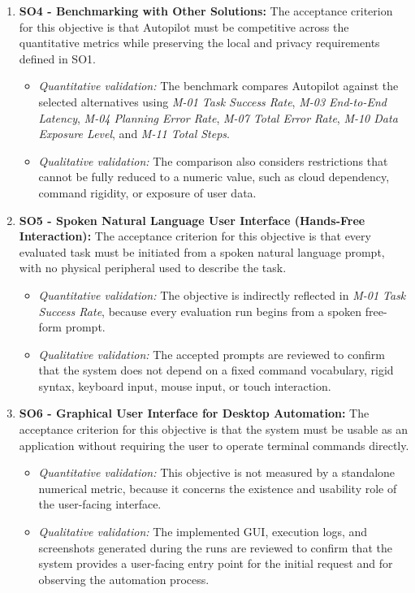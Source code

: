 \begin{enumerate}
    \item \textbf{SO4 - Benchmarking with Other Solutions:}
    The acceptance criterion for this objective is that Autopilot must be competitive across the quantitative metrics while preserving the local and privacy requirements defined in SO1.

    \begin{itemize}
        \item \textit{Quantitative validation:} The benchmark compares Autopilot against the selected alternatives using \textit{M-01 Task Success Rate}, \textit{M-03 End-to-End Latency}, \textit{M-04 Planning Error Rate}, \textit{M-07 Total Error Rate}, \textit{M-10 Data Exposure Level}, and \textit{M-11 Total Steps}.
        \item \textit{Qualitative validation:} The comparison also considers restrictions that cannot be fully reduced to a numeric value, such as cloud dependency, command rigidity, or exposure of user data.
    \end{itemize}

    \item \textbf{SO5 - Spoken Natural Language User Interface (Hands-Free Interaction):}
    The acceptance criterion for this objective is that every evaluated task must be initiated from a spoken natural language prompt, with no physical peripheral used to describe the task.

    \begin{itemize}
        \item \textit{Quantitative validation:} The objective is indirectly reflected in \textit{M-01 Task Success Rate}, because every evaluation run begins from a spoken free-form prompt.
        \item \textit{Qualitative validation:} The accepted prompts are reviewed to confirm that the system does not depend on a fixed command vocabulary, rigid syntax, keyboard input, mouse input, or touch interaction.
    \end{itemize}

    \item \textbf{SO6 - Graphical User Interface for Desktop Automation:}
    The acceptance criterion for this objective is that the system must be usable as an application without requiring the user to operate terminal commands directly.

    \begin{itemize}
        \item \textit{Quantitative validation:} This objective is not measured by a standalone numerical metric, because it concerns the existence and usability role of the user-facing interface.
        \item \textit{Qualitative validation:} The implemented GUI, execution logs, and screenshots generated during the runs are reviewed to confirm that the system provides a user-facing entry point for the initial request and for observing the automation process.
    \end{itemize}

\end{enumerate}